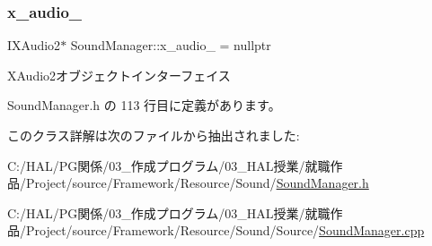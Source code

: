 \subsubsection{\texorpdfstring{x\+\_\+audio\+\_\+}{x\_audio\_}}
{\footnotesize\ttfamily I\+X\+Audio2$\ast$ Sound\+Manager\+::x\+\_\+audio\+\_\+ = nullptr\hspace{0.3cm}{\ttfamily [private]}}



X\+Audio2オブジェクトインターフェイス 



 Sound\+Manager.\+h の 113 行目に定義があります。



このクラス詳解は次のファイルから抽出されました\+:\begin{DoxyCompactItemize}
\item 
C\+:/\+H\+A\+L/\+P\+G関係/03\+\_\+作成プログラム/03\+\_\+\+H\+A\+L授業/就職作品/\+Project/source/\+Framework/\+Resource/\+Sound/\mbox{\hyperlink{_sound_manager_8h}{Sound\+Manager.\+h}}\item 
C\+:/\+H\+A\+L/\+P\+G関係/03\+\_\+作成プログラム/03\+\_\+\+H\+A\+L授業/就職作品/\+Project/source/\+Framework/\+Resource/\+Sound/\+Source/\mbox{\hyperlink{_sound_manager_8cpp}{Sound\+Manager.\+cpp}}\end{DoxyCompactItemize}
